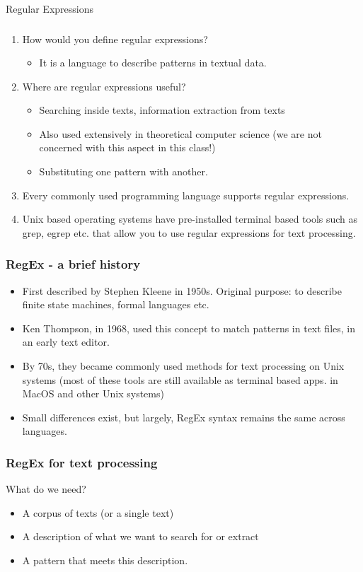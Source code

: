 \documentclass{beamer}
\begin{document}
\begin{frame}
\Large Regular Expressions
\end{frame}

\begin{frame}
\frametitle{}
\begin{enumerate}
\item How would you define regular expressions? \pause
\begin{itemize}
\item It is a language to describe patterns in textual data. 
\end{itemize}
\item Where are regular expressions useful? \pause
\begin{itemize}
\item Searching inside texts, information extraction from texts
\item Also used extensively in theoretical computer science (we are not concerned with this aspect in this class!)
\item Substituting one pattern with another.
\end{itemize} \pause
\item Every commonly used programming language supports regular expressions. 
\item Unix based operating systems have pre-installed terminal based tools such as grep, egrep etc. that allow you to use regular expressions for text processing.  
\end{enumerate}
\end{frame}

\begin{frame}
\frametitle{RegEx - a brief history}
\begin{itemize}
\item First described by Stephen Kleene in 1950s. Original purpose: to describe finite state machines, formal languages etc.
\item Ken Thompson, in 1968, used this concept to match patterns in text files, in an early text editor. 
\item By 70s, they became commonly used methods for text processing on Unix systems (most of these tools are still available as terminal based apps. in MacOS and other Unix systems)
\item Small differences exist, but largely, RegEx syntax remains the same across languages.
\end{itemize}
\end{frame}

\begin{frame}
\frametitle{RegEx for text processing}
What do we need?
\begin{itemize}
\item A corpus of texts (or a single text)
\item A description of what we want to search for or extract
\item A pattern that meets this description.
\end{itemize}
\end{frame}
\end{document}
